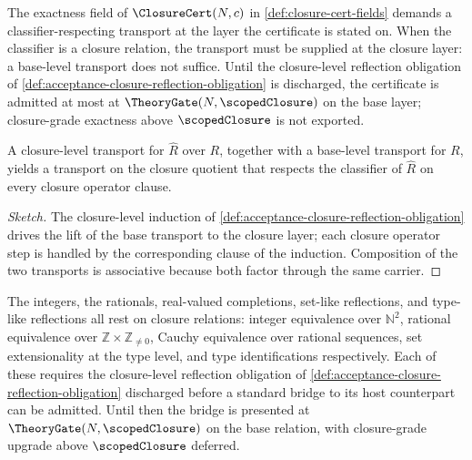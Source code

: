 \begin{remark}
\label{rem:acceptance-closure-exactness-gating}
The exactness field of $\ClosureCert(N, c)$ in \autoref{def:closure-cert-fields} demands a classifier-respecting transport at the layer the certificate is stated on. When the classifier is a closure relation, the transport must be supplied at the closure layer: a base-level transport does not suffice. Until the closure-level reflection obligation of \autoref{def:acceptance-closure-reflection-obligation} is discharged, the certificate is admitted at most at $\TheoryGate(N, \scopedClosure)$ on the base layer; closure-grade exactness above $\scopedClosure$ is not exported.
\end{remark}

\begin{theorem}
\label{thm:acceptance-closure-base-compose}
A closure-level transport for $\widehat{R}$ over $R$, together with a base-level transport for $R$, yields a transport on the closure quotient that respects the classifier of $\widehat{R}$ on every closure operator clause.
\end{theorem}
\begin{proof}[Sketch]
The closure-level induction of \autoref{def:acceptance-closure-reflection-obligation} drives the lift of the base transport to the closure layer; each closure operator step is handled by the corresponding clause of the induction. Composition of the two transports is associative because both factor through the same carrier.
\end{proof}

\begin{remark}
\label{rem:acceptance-bridge-downstream}
The integers, the rationals, real-valued completions, set-like reflections, and type-like reflections all rest on closure relations: integer equivalence over $\mathbb{N}^2$, rational equivalence over $\mathbb{Z} \times \mathbb{Z}_{\ne 0}$, Cauchy equivalence over rational sequences, set extensionality at the type level, and type identifications respectively. Each of these requires the closure-level reflection obligation of \autoref{def:acceptance-closure-reflection-obligation} discharged before a standard bridge to its host counterpart can be admitted. Until then the bridge is presented at $\TheoryGate(N, \scopedClosure)$ on the base relation, with closure-grade upgrade above $\scopedClosure$ deferred.
\end{remark}

